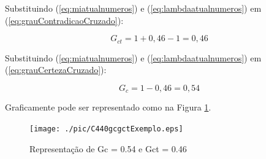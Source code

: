 Substituindo (\ref{eq:miatualnumeros}) e (\ref{eq:lambdaatualnumeros}) em (\ref{eq:grauContradicaoCruzado}):

\begin{equation}
G _{ct} = 1 + 0,46 - 1 = 0,46
\label{eq:grauContradicaoResulta}
\end{equation}

Substituindo (\ref{eq:miatualnumeros}) e (\ref{eq:lambdaatualnumeros}) em (\ref{eq:grauCertezaCruzado}):

\begin{equation}
G _{c} = 1 - 0,46 = 0,54
\label{eq:grauCertezaResulta}
\end{equation}

Graficamente pode ser representado como na Figura \ref{fig:gcgctExemplo}.

\begin{figure}[!htb]
\center\texttt{[image: ./pic/C440gcgctExemplo.eps]}
\caption{Representação de Gc = 0.54 e Gct = 0.46}
\label{fig:gcgctExemplo}
\end{figure}




